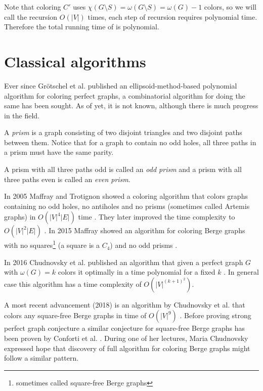 Note that coloring $C'$ uses $\chi(G \setminus S) = \omega(G \setminus S) = \omega(G) -1$ colors, so we will call the recursion $O(|V|)$ times, each step of recursion requires polynomial time. Therefore the total running time of  is polynomial.

\section{Classical algorithms}
\label{sec:classicalColoring}

Ever since Grötschel et al. published an ellipsoid-method-based polynomial algorithm for coloring perfect graphs, a combinatorial algorithm for doing the same has been sought. As of yet, it is not known, although there is much progress in the field.

\begin{defn}[prism]
  A \emph{prism} is a graph consisting of two disjoint triangles and two disjoint paths between them. Notice that for a graph to contain no odd holes, all three paths in a prism must have the same parity.
  \label{def:prism}
\end{defn}

A prism with all three paths odd is called an \emph{odd prism} and a prism with all three paths even is called an \emph{even prism}.

In 2005 Maffray and Trotignon showed a coloring algorithm that colors graphs containing no odd holes, no antiholes and no prisms (sometimes called Artemis graphs) in $O(|V|^4|E|)$ time \cite{Maffray2006}. They later improved the time complexity to $O(|V|^2|E|)$ \cite{coloringArtemis}. In 2015 Maffray showed an algorithm for coloring Berge graphs with no squares\footnote{sometimes called square-free Berge graphs} (a square is a $C_4$) and no odd prisms \cite{Maff2015}.

In 2016 Chudnovsky et al. published an algorithm that given a perfect graph $G$ with $\omega(G) = k$ colors it optimally in a time polynomial for a fixed $k$ \cite{Chudnovsky2017}. In general case this algorithm has a time complexity of $O(|V|^{(k+1)^2})$.

A most recent advancement (2018) is an algorithm by Chudnovsky et al. that colors any square-free Berge graphs in time of $O(|V|^9)$ \cite{coloringSquareFree}. Before proving strong perfect graph conjecture a similar conjecture for square-free Berge graphs has been proven by Conforti et al. \cite{Conforti2004}. During one of her lectures, Maria Chudnovsky expressed hope that discovery of full algorithm for coloring Berge graphs might follow a similar pattern.

